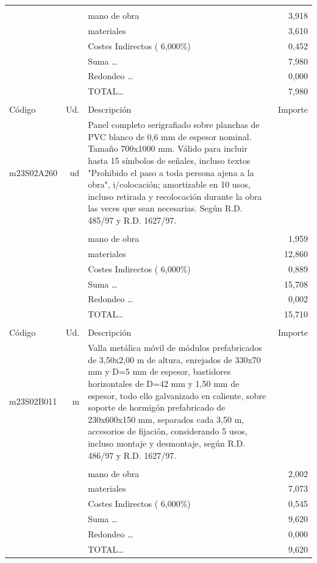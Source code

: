 \documentclass{book}%
\begin{document}
\begin{supertabular}{l r p{60mm} r}
&&&\\%
&&mano de obra&     3,918\\%
&&materiales&     3,610\\%
&&Costes Indirectos (     6,000\%)&     0,452\\%
&&Suma \ldots&     7,980\\%
&&Redondeo \ldots&     0,000\\%
%
&&TOTAL\ldots&     7,980\\%
&&&\\%
Código&Ud.&Descripción&Importe\\%
\hline%
m23S02A260&ud&Panel completo serigrafiado sobre planchas de PVC blanco de 0,6 mm de espesor nominal. Tamaño 700x1000 mm. Válido para incluir hasta 15 símbolos de señales, incluso textos "Prohibido el paso a toda persona ajena a la obra", i/colocación; amortizable en 10 usos, incluso retirada y recolocación durante la obra las veces que sean necesarias. Según R.D. 485/97 y R.D. 1627/97.&\\%
&&&\\%
&&mano de obra&     1,959\\%
&&materiales&    12,860\\%
&&Costes Indirectos (     6,000\%)&     0,889\\%
&&Suma \ldots&    15,708\\%
&&Redondeo \ldots&     0,002\\%
%
&&TOTAL\ldots&    15,710\\%
&&&\\%
Código&Ud.&Descripción&Importe\\%
\hline%
m23S02B011&m&Valla metálica móvil de módulos prefabricados de 3,50x2,00 m de altura, enrejados de 330x70 mm y D=5 mm de espesor, bastidores horizontales de D=42 mm y 1,50 mm de espesor, todo ello galvanizado en caliente, sobre soporte de hormigón prefabricado de 230x600x150 mm, separados cada 3,50 m, accesorios de fijación, considerando 5 usos, incluso montaje y desmontaje, según R.D. 486/97 y R.D. 1627/97.&\\%
&&&\\%
&&mano de obra&     2,002\\%
&&materiales&     7,073\\%
&&Costes Indirectos (     6,000\%)&     0,545\\%
&&Suma \ldots&     9,620\\%
&&Redondeo \ldots&     0,000\\%
%
&&TOTAL\ldots&     9,620\\%

\end{supertabular}
\end{document}
